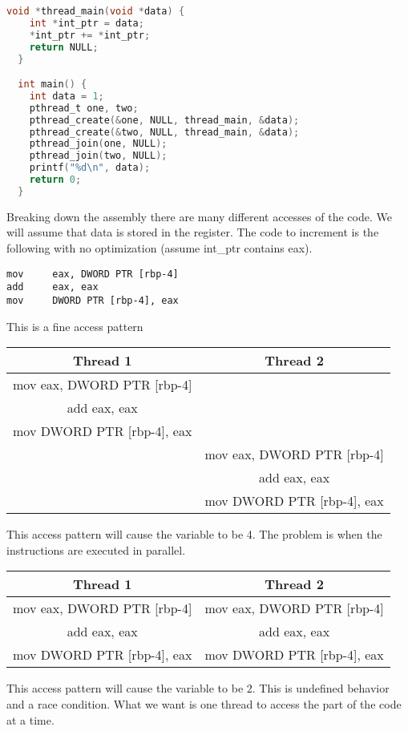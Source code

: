 \begin{lstlisting}[language=C]
  void *thread_main(void *data) {
    int *int_ptr = data;
    *int_ptr += *int_ptr;
    return NULL;
  }

  int main() {
    int data = 1;
    pthread_t one, two;
    pthread_create(&one, NULL, thread_main, &data);
    pthread_create(&two, NULL, thread_main, &data);
    pthread_join(one, NULL);
    pthread_join(two, NULL);
    printf("%d\n", data);
    return 0;
  }
\end{lstlisting}

Breaking down the assembly there are many different accesses of the code.
We will assume that data is stored in the  register.
The code to increment is the following with no optimization (assume int_ptr contains eax).

\begin{lstlisting}
mov     eax, DWORD PTR [rbp-4]
add     eax, eax
mov     DWORD PTR [rbp-4], eax
\end{lstlisting}

This is a fine access pattern

\begin{tabular}{| c | c |}
  Thread 1 & Thread 2 \\ \hline
mov     eax, DWORD PTR [rbp-4] & \\
add     eax, eax & \\
mov     DWORD PTR [rbp-4], eax & \\ \hline
& mov     eax, DWORD PTR [rbp-4] \\
& add     eax, eax \\
& mov     DWORD PTR [rbp-4], eax \\ \hline
\end{tabular}

This access pattern will cause the variable  to be 4.
The problem is when the instructions are executed in parallel.

\begin{tabular}{| c | c |}
  Thread 1 & Thread 2 \\ \hline
mov     eax, DWORD PTR [rbp-4] & mov     eax, DWORD PTR [rbp-4] \\
add     eax, eax & add     eax, eax \\
mov     DWORD PTR [rbp-4], eax & mov     DWORD PTR [rbp-4], eax \\
\end{tabular}

This access pattern will cause the variable  to be 2.
This is undefined behavior and a race condition.
What we want is one thread to access the part of the code at a time.


